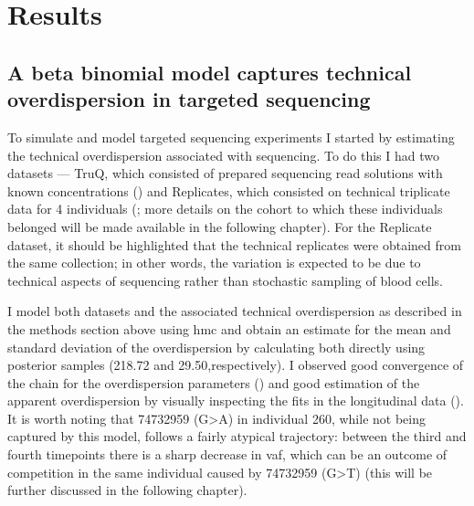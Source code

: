 \section{Results}

\subsection{A beta binomial model captures technical overdispersion in targeted sequencing}

To simulate and model targeted sequencing experiments I started by estimating the technical overdispersion associated with sequencing. To do this I had two datasets --- TruQ, which consisted of prepared sequencing read solutions with known concentrations () and Replicates, which consisted on technical triplicate data for 4 individuals (; more details on the cohort to which these individuals belonged will be made available in the following chapter). For the Replicate dataset, it should be highlighted that the technical replicates were obtained from the same collection; in other words, the variation is expected to be due to technical aspects of sequencing rather than stochastic sampling of blood cells. 

I model both datasets and the associated technical overdispersion as described in the methods section above using \ac{hmc} and obtain an estimate for the mean and standard deviation of the overdispersion by calculating both directly using posterior samples (218.72 and 29.50,respectively). I observed good convergence of the chain for the overdispersion parameters () and good estimation of the apparent overdispersion by visually inspecting the fits in the longitudinal data (). It is worth noting that 74732959 (G>A) in individual 260, while not being captured by this model, follows a fairly atypical trajectory: between the third and fourth timepoints there is a sharp decrease in \ac{vaf}, which can be an outcome of competition in the same individual caused by 74732959 (G>T) (this will be further discussed in the following chapter).

\begin{figure}[!ht]
	\label{fig:truq-data}
\end{figure}

